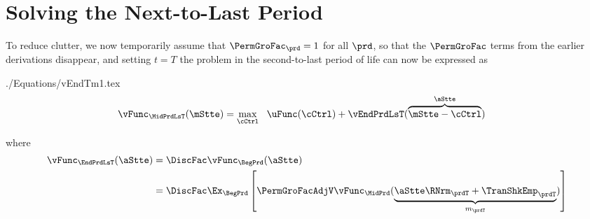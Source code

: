 \documentclass[\econtexRoot/SolvingMicroDSOPs]{subfiles}
\begin{document}
\hypertarget{solving-the-next-to-last-period}{}
\hypertarget{solving-the-next}{}
\section{Solving the Next-to-Last Period}\label{sec:solving-the-next}

To reduce clutter, we now temporarily assume that $\PermGroFac_{\prd}=1$ for all $\prd$, so that the $\PermGroFac$ terms from the earlier derivations disappear, and setting $t=T$ the problem in the second-to-last period of life can now be expressed as
\begin{verbatimwrite}{./Equations/vEndTm1.tex}
\begin{equation}\begin{gathered}\begin{aligned}
  \vFunc_{\MidPrdLsT}(\mStte)  & = \max_{\cCtrl} ~~ \uFunc(\cCtrl) +
                              \vEndPrdLsT(\overbrace{\mStte-\cCtrl}^{\aStte})
                              \label{eq:vEndTm1}
\end{aligned}\end{gathered}\end{equation}
\end{verbatimwrite}
\unskip
where 
\begin{equation*}\begin{gathered}\begin{aligned}
  \vFunc_{\EndPrdLsT}(\aStte)  & = \DiscFac \vFunc_{\BegPrd}(\aStte) 
\\                          & = \DiscFac \Ex_{\BegPrd} \left[\PermGroFacAdjV \vFunc_{\MidPrd}(\underbrace{\aStte \RNrm_{\prdT} + \TranShkEmp_{\prdT}}_{{m}_{\prdT}})\right]
    \end{aligned}\end{gathered}\end{equation*}

\end{document}
